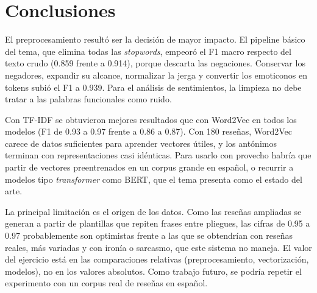 \documentclass[11pt,letterpaper]{article}
\begin{document}
\section{Conclusiones}

El preprocesamiento resultó ser la decisión de mayor impacto. El pipeline básico del tema, que elimina todas las \textit{stopwords}, empeoró el F1 macro respecto del texto crudo (0.859 frente a 0.914), porque descarta las negaciones. Conservar los negadores, expandir su alcance, normalizar la jerga y convertir los emoticonos en tokens subió el F1 a 0.939. Para el análisis de sentimientos, la limpieza no debe tratar a las palabras funcionales como ruido.

Con TF-IDF se obtuvieron mejores resultados que con Word2Vec en todos los modelos (F1 de 0.93 a 0.97 frente a 0.86 a 0.87). Con 180 reseñas, Word2Vec carece de datos suficientes para aprender vectores útiles, y los antónimos terminan con representaciones casi idénticas. Para usarlo con provecho habría que partir de vectores preentrenados en un corpus grande en español, o recurrir a modelos tipo \textit{transformer} como BERT, que el tema presenta como el estado del arte.

La principal limitación es el origen de los datos. Como las reseñas ampliadas se generan a partir de plantillas que repiten frases entre pliegues, las cifras de 0.95 a 0.97 probablemente son optimistas frente a las que se obtendrían con reseñas reales, más variadas y con ironía o sarcasmo, que este sistema no maneja. El valor del ejercicio está en las comparaciones relativas (preprocesamiento, vectorización, modelos), no en los valores absolutos. Como trabajo futuro, se podría repetir el experimento con un corpus real de reseñas en español.

\end{document}
